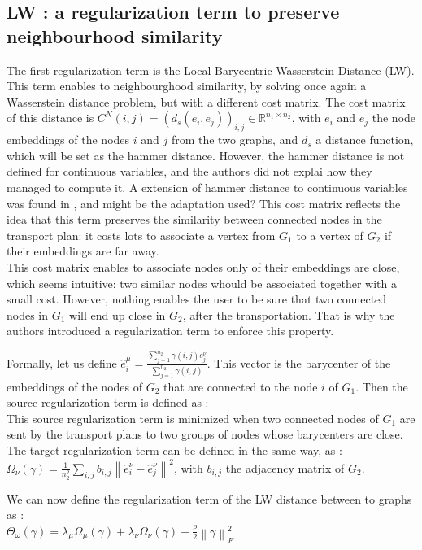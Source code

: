 \documentclass[a4paper,11pt]{article}
\begin{document}
\subsection{LW : a regularization term to preserve neighbourhood similarity}
\label{LW}
The first regularization term is the Local Barycentric Wasserstein Distance (LW). 
This term enables to neighbourghood similarity, by solving once again a Wasserstein distance problem, but with a different cost matrix.
The cost matrix of this distance is $C^N(i,j) = (d_s(e_i, e_j))_{i,j} \in \mathbb{R}^{n_1 \times n_2}$, with $e_i$ and $e_j$ the node embeddings of the nodes $i$ and $j$ from the two graphs, and $d_s$ a distance function, which will be set as the hammer distance. 
However, the hammer distance is not defined for continuous variables, and the authors did not explai how they managed to compute it.
A extension of hammer distance to continuous variables was found in \cite{labib2019hamming}, and might be the adaptation used? 
This cost matrix reflects the idea that this term preserves the similarity between connected nodes in the transport plan: it costs lots to associate a vertex from $G_1$ to a vertex of $G_2$ if their embeddings are far away.\\
This cost matrix enables to associate nodes only of their embeddings are close, which seems intuitive: two similar nodes whould be associated together with a small cost.
However, nothing enables the user to be sure that two connected nodes in $G_1$ will end up close in $G_2$, after the transportation. 
That is why the authors introduced a regularization term to enforce this property.

Formally, let us define $ \hat{e}_i^\mu = \frac{\sum_{j=1}^{n_2} \gamma(i,j)e_j^{\nu}}{\sum_{j=1}^{n_2} \gamma(i,j)}$. 
This vector is the barycenter of the embeddings of the nodes of $G_2$ that are connected to the node $i$ of $G_1$.
Then the source regularization term is defined as : \\
This source regularization term is minimized when two connected nodes of $G_1$ are sent by the transport plans to two groups of nodes whose barycenters are close.\\
The target regularization term can be defined in the same way, as : $\Omega_\nu(\gamma) = \frac{1}{n_2^2} \sum_{i,j} b_{i,j} \left\lVert \hat{e}_i^\nu - \hat{e}_j^\nu\right\rVert ^2 $, with $b_{i,j}$ the adjacency matrix of $G_2$.

We can now define the regularization term of the LW distance between to graphs as : 
\\ $\Theta_\omega(\gamma) = \lambda_\mu \Omega_\mu(\gamma) + \lambda_\nu \Omega_\nu(\gamma) + \frac{\rho}{2} \left\lVert \gamma \right\rVert _F^2 $\\
\end{document}
